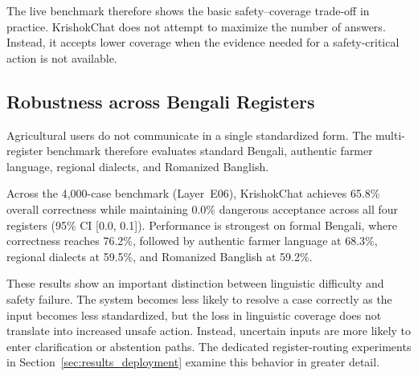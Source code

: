 \documentclass[a4paper,fleqn]{cas-dc}
\begin{document}
The live benchmark therefore shows the basic safety--coverage trade-off in practice. KrishokChat does not attempt to maximize the number of answers. Instead, it accepts lower coverage when the evidence needed for a safety-critical action is not available.

\begin{table}[pos=t]
\centering
\caption{End-to-end advisory performance on the live benchmark (Layer E27, $n=100$ per system; 70 naturalistic + 30 adversarial Bengali queries; 100\% real live API completions and backend execution).}
\label{tab:end_to_end_advisory}
\label{tab:live_benchmark}
\small
{}
\end{table}

\subsection{Robustness across Bengali Registers}

Agricultural users do not communicate in a single standardized form. The multi-register benchmark therefore evaluates standard Bengali, authentic farmer language, regional dialects, and Romanized Banglish.

Across the 4{,}000-case benchmark (Layer~E06), KrishokChat achieves 65.8\% overall correctness while maintaining 0.0\% dangerous acceptance across all four registers (95\% CI [0.0, 0.1]). Performance is strongest on formal Bengali, where correctness reaches 76.2\%, followed by authentic farmer language at 68.3\%, regional dialects at 59.5\%, and Romanized Banglish at 59.2\%.

These results show an important distinction between linguistic difficulty and safety failure. The system becomes less likely to resolve a case correctly as the input becomes less standardized, but the loss in linguistic coverage does not translate into increased unsafe action. Instead, uncertain inputs are more likely to enter clarification or abstention paths. The dedicated register-routing experiments in Section~\ref{sec:results_deployment} examine this behavior in greater detail.
\end{document}
